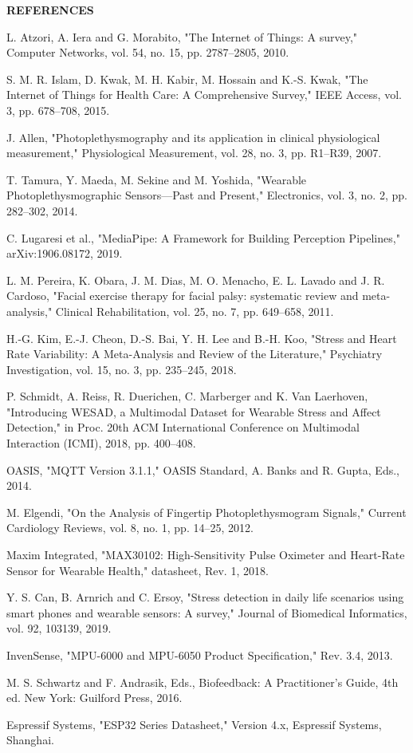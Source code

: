 \documentclass[12pt,letterpaper,oneside]{report}
\begin{document}
\clearpage
{\noindent\bfseries\fontsize{16}{22}\selectfont REFERENCES}\label{refs}\par\vspace{8pt}
{\setlength{\parskip}{6pt}
\noindent[1] L. Atzori, A. Iera and G. Morabito, "The Internet of Things: A survey," Computer Networks, vol. 54, no. 15, pp. 2787–2805, 2010.\par
\noindent[2] S. M. R. Islam, D. Kwak, M. H. Kabir, M. Hossain and K.-S. Kwak, "The Internet of Things for Health Care: A Comprehensive Survey," IEEE Access, vol. 3, pp. 678–708, 2015.\par
\noindent[3] J. Allen, "Photoplethysmography and its application in clinical physiological measurement," Physiological Measurement, vol. 28, no. 3, pp. R1–R39, 2007.\par
\noindent[4] T. Tamura, Y. Maeda, M. Sekine and M. Yoshida, "Wearable Photoplethysmographic Sensors—Past and Present," Electronics, vol. 3, no. 2, pp. 282–302, 2014.\par
\noindent[5] C. Lugaresi et al., "MediaPipe: A Framework for Building Perception Pipelines," arXiv:1906.08172, 2019.\par
\noindent[6] L. M. Pereira, K. Obara, J. M. Dias, M. O. Menacho, E. L. Lavado and J. R. Cardoso, "Facial exercise therapy for facial palsy: systematic review and meta-analysis," Clinical Rehabilitation, vol. 25, no. 7, pp. 649–658, 2011.\par
\noindent[7] H.-G. Kim, E.-J. Cheon, D.-S. Bai, Y. H. Lee and B.-H. Koo, "Stress and Heart Rate Variability: A Meta-Analysis and Review of the Literature," Psychiatry Investigation, vol. 15, no. 3, pp. 235–245, 2018.\par
\noindent[8] P. Schmidt, A. Reiss, R. Duerichen, C. Marberger and K. Van Laerhoven, "Introducing WESAD, a Multimodal Dataset for Wearable Stress and Affect Detection," in Proc. 20th ACM International Conference on Multimodal Interaction (ICMI), 2018, pp. 400–408.\par
\noindent[9] OASIS, "MQTT Version 3.1.1," OASIS Standard, A. Banks and R. Gupta, Eds., 2014.\par
\noindent[10] M. Elgendi, "On the Analysis of Fingertip Photoplethysmogram Signals," Current Cardiology Reviews, vol. 8, no. 1, pp. 14–25, 2012.\par
\noindent[11] Maxim Integrated, "MAX30102: High-Sensitivity Pulse Oximeter and Heart-Rate Sensor for Wearable Health," datasheet, Rev. 1, 2018.\par
\noindent[12] Y. S. Can, B. Arnrich and C. Ersoy, "Stress detection in daily life scenarios using smart phones and wearable sensors: A survey," Journal of Biomedical Informatics, vol. 92, 103139, 2019.\par
\noindent[13] InvenSense, "MPU-6000 and MPU-6050 Product Specification," Rev. 3.4, 2013.\par
\noindent[14] M. S. Schwartz and F. Andrasik, Eds., Biofeedback: A Practitioner's Guide, 4th ed. New York: Guilford Press, 2016.\par
\noindent[15] Espressif Systems, "ESP32 Series Datasheet," Version 4.x, Espressif Systems, Shanghai.\par
}
\end{document}
